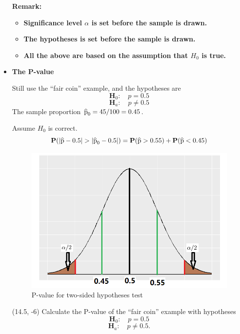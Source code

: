 \documentclass[a4paper, 12pt,twoside]{book}
\newcommand\reallywidehat[1]{%
\savestack{\tmpbox}{\stretchto{%
  \scaleto{%
    \scalerel*[\widthof{\ensuremath{#1}}]{\kern-.6pt\bigwedge\kern-.6pt}%
    {\rule[-\textheight/2]{1ex}{\textheight}}%
  }{\textheight}%
}{0.5ex}}%
\stackon[1pt]{#1}{\tmpbox}%
}
\begin{document}
\begin{itemize}
\colorbox{babypink}{\parbox{0.9\textwidth}{
\textbf{Remark:}\vspace{0.3cm}

 \begin{itemize}
     \item \textbf{Significance level $\alpha$ is set before the sample is drawn.} 
     \item \textbf{The hypotheses is set before the sample is drawn.}
     \item \textbf{All the above are based on the assumption that $H_0$ is true.}
 \end{itemize}

}}

\newpage

\item \textbf{The P-value}\vspace{0.3cm}

Still use the ``fair coin'' example, and the hypotheses are
$$\textbf{H}_0:\quad p=0.5$$
$$\textbf{H}_a:\quad p\ne0.5$$ 
The sample proportion $\reallywidehat{p}_0 = 45/100 = 0.45$.\vspace{0.3cm}

Assume $H_0$ is correct.
$$\textbf{P}(|\reallywidehat{p}-0.5| > |\reallywidehat{p}_0-0.5|)= \textbf{P}(\reallywidehat{p}>0.55) + \textbf{P}(\reallywidehat{p}<0.45)$$
     \begin{figure}[H]
     \centering
     \includegraphics[scale=0.5]{PvalueTwoSided}
     \caption{P-value for two-sided hypotheses test}
     \label{PvalueTwoSided}
     \end{figure}
 
 \begin{textblock}{3.6}(14.5, -6)
Calculate the P-value of the ``fair coin'' example with hypotheses $$\textbf{H}_0:\quad p=0.5$$
$$\textbf{H}_a:\quad p\ne0.5.$$ 
\end{textblock}



\end{itemize}
\end{document}

